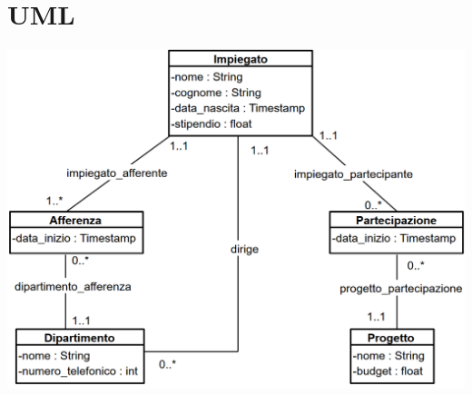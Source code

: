 \documentclass{article}
\begin{document}


\section{UML}

\includegraphics[width=\textwidth]{UML.png}
\end{document}
